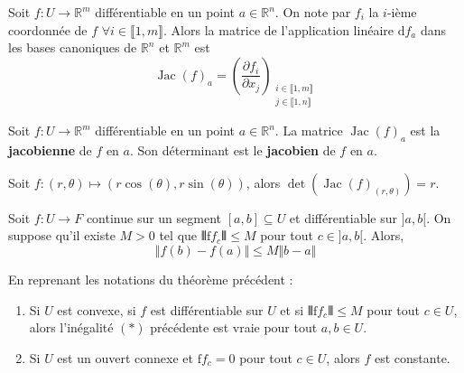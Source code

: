 	
	\begin{corollary}
		Soit $f : U \rightarrow \mathbb{R}^m$ différentiable en un point $a \in \mathbb{R}^n$. On note par $f_i$ la $i$-ième coordonnée de $f$ $\forall i \in \llbracket 1, m \rrbracket$. Alors la matrice de l'application linéaire $\mathrm{d}f_a$ dans les bases canoniques de $\mathbb{R}^n$ et $\mathbb{R}^m$ est
		\[ \operatorname{Jac}(f)_a = \left( \frac{\partial f_i}{\partial x_j} \right)_{\substack{i \in \llbracket 1, m \rrbracket \\ j \in \llbracket 1, n \rrbracket}} \]
	\end{corollary}
	
	\begin{definition}
		Soit $f : U \rightarrow \mathbb{R}^m$ différentiable en un point $a \in \mathbb{R}^n$. La matrice $\operatorname{Jac}(f)_a$ est la \textbf{jacobienne} de $f$ en $a$. Son déterminant est le \textbf{jacobien} de $f$ en $a$.
	\end{definition}
	
	
	\begin{example}
		Soit $f : (r,\theta) \mapsto (r\cos(\theta), r\sin(\theta))$, alors $\det(\operatorname{Jac}(f)_{(r,\theta)}) = r$.
	\end{example}
	
	
	\begin{theorem}
		Soit $f : U \rightarrow F$ continue sur un segment $[a,b] \subseteq U$ et différentiable sur $]a,b[$. On suppose qu'il existe $M > 0$ tel que $\VERT \mathrm{f}f_c \VERT \leq M$ pour tout $c \in ]a,b[$. Alors,
		\[ \Vert f(b) - f(a) \Vert \leq M \Vert b - a \Vert \tag{$*$} \]
	\end{theorem}
	
	\begin{corollary}
		En reprenant les notations du théorème précédent :
		\begin{enumerate}[label=(\roman*)]
			\item Si $U$ est convexe, si $f$ est différentiable sur $U$ et si $\VERT \mathrm{f}f_c \VERT \leq M$ pour tout $c \in U$, alors l'inégalité $(*)$ précédente est vraie pour tout $a,b \in U$.
			\item Si $U$ est un ouvert connexe et $\mathrm{f}f_c = 0$ pour tout $c \in U$, alors $f$ est constante.
		\end{enumerate}
	\end{corollary}
	
